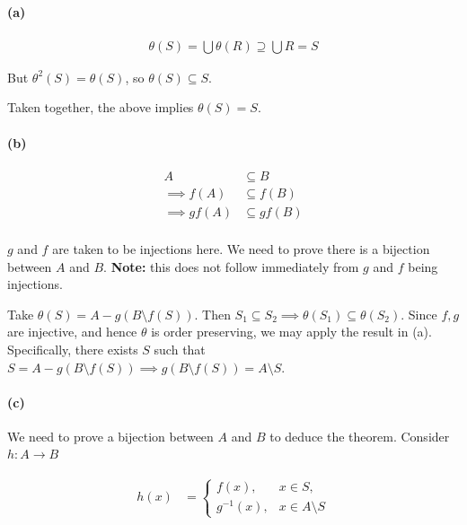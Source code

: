 \documentclass{article}
\begin{document}
\paragraph{(a)}

\begin{align*}
  \theta(S) = \bigcup \theta(R) \supseteq \bigcup R = S
\end{align*}

But $\theta^2(S) = \theta(S)$, so $\theta(S) \subseteq S$.

Taken together, the above implies $\theta(S) = S$.

\paragraph{(b)}
\begin{align*}
  A &\subseteq B \\
  \implies f\left(A\right) &\subseteq f\left(B\right) \\
  \implies gf\left(A\right) &\subseteq gf\left(B\right) \\
\end{align*}

$g$ and $f$ are taken to be injections here. We need to prove there is a bijection between $A$ and $B$. \textbf{Note:} this does not follow immediately from $g$
and $f$ being injections.

Take $\theta(S) = A - g\left(B \setminus f\left(S\right)\right)$. Then $S_1 \subseteq S_2 \implies \theta(S_1) \subseteq \theta(S_2)$. Since $f, g$ are injective, and hence $\theta$ is order preserving, we may apply the result in (a). Specifically, there exists $S$ such that $S = A - g\left(B \setminus f\left(S\right)\right) \implies g\left(B \setminus f\left(S\right)\right) = A \setminus S$.

\paragraph{(c)}

We need to prove a bijection between $A$ and $B$ to deduce the theorem. Consider $h\colon A \rightarrow B$

\begin{align*}
  h(x) &= \begin{cases}
    f(x), & x \in S,  \\
    g^{-1}(x), & x \in A \setminus S
  \end{cases} \\
\end{align*}
\end{document}
